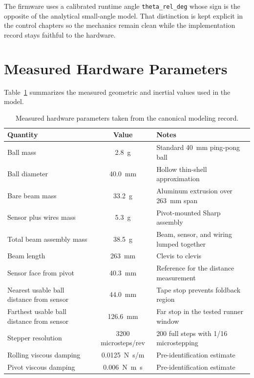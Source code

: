 The firmware uses a calibrated runtime angle \verb|theta_rel_deg| whose sign is the
opposite of the analytical small-angle model. That distinction is kept explicit in the
control chapters so the mechanics remain clean while the implementation record stays
faithful to the hardware.

\section{Measured Hardware Parameters}

Table~\ref{tab:raw_measurements} summarizes the measured geometric and inertial values
used in the model.

\begin{table}[tbp]
  \centering
  \small
  \caption{Measured hardware parameters taken from the canonical modeling record.}
  \label{tab:raw_measurements}
  \begin{tabularx}{\linewidth}{@{}l c X@{}}
    \toprule
    Quantity & Value & Notes \\
    \midrule
    Ball mass & \SI{2.8}{g} & Standard \SI{40}{mm} ping-pong ball \\
    Ball diameter & \SI{40.0}{mm} & Hollow thin-shell approximation \\
    Bare beam mass & \SI{33.2}{g} & Aluminum extrusion over \SI{263}{mm} span \\
    Sensor plus wires mass & \SI{5.3}{g} & Pivot-mounted Sharp assembly \\
    Total beam assembly mass & \SI{38.5}{g} & Beam, sensor, and wiring lumped together \\
    Beam length & \SI{263}{mm} & Clevis to clevis \\
    Sensor face from pivot & \SI{40.3}{mm} & Reference for the distance measurement \\
    Nearest usable ball distance from sensor & \SI{44.0}{mm} & Tape stop prevents foldback region \\
    Farthest usable ball distance from sensor & \SI{126.6}{mm} & Far stop in the tested runner window \\
    Stepper resolution & \num{3200} microsteps/rev & \num{200} full steps with 1/16 microstepping \\
    Rolling viscous damping & \SI{0.0125}{N.s/m} & Pre-identification estimate \\
    Pivot viscous damping & \SI{0.006}{N.m.s} & Pre-identification estimate \\
    \bottomrule
  \end{tabularx}
\end{table}

